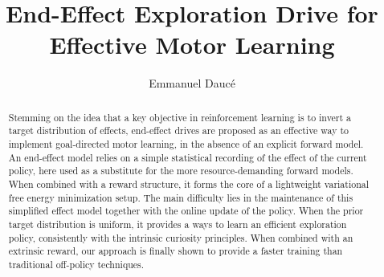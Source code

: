 \documentclass[runningheads]{llncs}
\begin{document}
%
\title{End-Effect Exploration Drive for Effective Motor Learning}
%
%
\author{Emmanuel Daucé}
%
%
%
\maketitle              %
%
\begin{abstract}
Stemming on the idea that a key objective in reinforcement learning is to invert a target distribution of effects, end-effect drives are proposed as an effective way to implement goal-directed motor learning, in the absence of an explicit forward model.  An end-effect model relies on a simple statistical recording of the effect of the current policy, here used  as a substitute for the more resource-demanding forward models. When combined with a reward structure, it forms the core of a lightweight variational free energy minimization setup. The main difficulty lies in the maintenance of this simplified effect model together with the online update of the policy. When the prior target distribution is uniform, it provides a ways to learn an efficient exploration policy, consistently with the intrinsic curiosity principles. When combined with an extrinsic reward, our approach is finally shown to provide a faster training than traditional off-policy techniques.  
\end{abstract}
%
%
%
\end{document}
